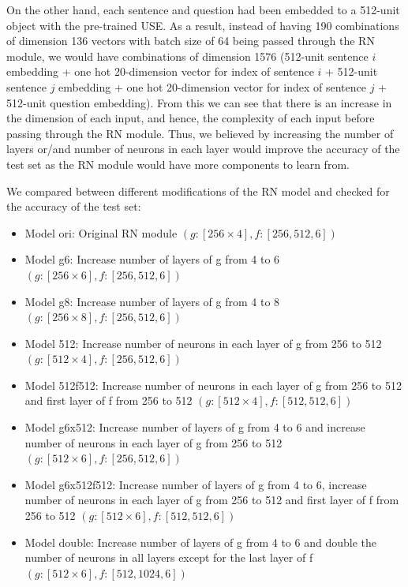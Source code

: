 \documentclass{article}
\begin{document}
 

On the other hand, each sentence and question had been embedded to a 512-unit object with the pre-trained USE. As a result, instead of having 190 combinations of dimension 136 vectors with batch size of 64 being passed through the RN module, we would have combinations of dimension 1576 (512-unit sentence $i$ embedding + one hot 20-dimension vector for index of sentence $i$ + 512-unit sentence $j$ embedding + one hot 20-dimension vector for index of sentence $j$ + 512-unit question embedding). From this we can see that there is an increase in the dimension of each input, and hence, the complexity of each input before passing through the RN module. Thus, we believed by increasing the number of layers or/and number of neurons in each layer would improve the accuracy of the test set as the RN module would have more components to learn from.

 

We compared between different modifications of the RN model and checked for the accuracy of the test set:

 

\begin{itemize}

\item Model ori: Original RN module $(g: [256 \times 4], f: [256,512,6])$

\item Model g6: Increase number of layers of g from 4 to 6 $(g: [256 \times 6], f: [256,512,6])$

\item Model g8: Increase number of layers of g from 4 to 8 $(g: [256 \times 8], f: [256,512,6])$

\item Model 512: Increase number of neurons in each layer of g from 256 to 512 $(g: [512 \times 4], f: [256,512,6])$

\item Model 512f512: Increase number of neurons in each layer of g from 256 to 512 and first layer of f from 256 to 512 $(g: [512 \times 4], f: [512,512,6])$

\item Model g6x512: Increase number of layers of g from 4 to 6 and increase number of neurons in each layer of g from 256 to 512 $(g: [512 \times 6], f: [256,512,6])$

\item Model g6x512f512: Increase number of layers of g from 4 to 6, increase number of neurons in each layer of g from 256 to 512 and first layer of f from 256 to 512 $(g: [512 \times 6], f: [512,512,6])$

\item Model double: Increase number of layers of g from 4 to 6 and double the number of neurons in all layers except for the last layer of f $(g: [512 \times 6], f: [512,1024,6])$

\end{itemize}
\end{document}
